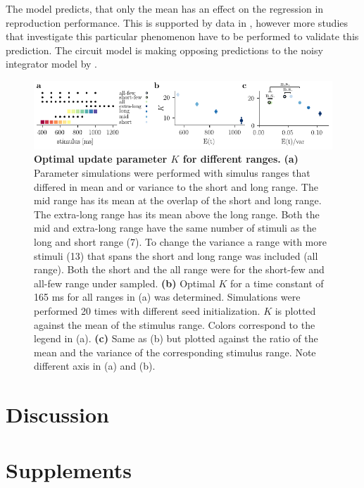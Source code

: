 \documentclass[10pt]{article}
\begin{document}
The model predicts, that only the mean has an effect on the regression in reproduction performance. This is supported by data in \cite{Petzschner2012}, however more studies that investigate this particular phenomenon have to be performed to validate this prediction. 
The circuit model is making opposing predictions to the noisy integrator model by \cite{Thurley2016}.

\begin{figure}[ht]
	\centering
	\includegraphics{figures/ranges_new.pdf}
	\caption{\textbf{Optimal update parameter $K$ for different ranges.} 
	\textbf{(a)} Parameter simulations were performed with simulus ranges that differed in mean and or variance to the short and long range. The mid range has its mean at the overlap of the short and long range. The extra-long range has its mean above the long range. Both the mid and extra-long range have the same number of stimuli as the long and short range (7). To change the variance a range with more stimuli (13) that spans the short and long range was included (all range). Both the short and the all range were for the short-few and all-few range under sampled.
	\textbf{(b)} Optimal $K$ for a time constant of 165 ms for all ranges in (a) was determined. Simulations were performed 20 times with different seed initialization. $K$ is plotted against the mean of the stimulus range. Colors correspond to the legend in (a).
	\textbf{(c)} Same as (b) but plotted against the ratio of the mean and the variance of the corresponding stimulus range. Note different axis in (a) and (b).
	}
\label{fig:new_ranges}
\end{figure}
\section{Discussion}


\pagebreak

\setcounter{section}{0}
\section*{Supplements}
\setcounter{figure}{0}
\setcounter{table}{0}
\setcounter{equation}{0} 
\renewcommand{\figurename}{Supplementary Figure}
\renewcommand{\tablename}{Supplementary Table}
\end{document}
